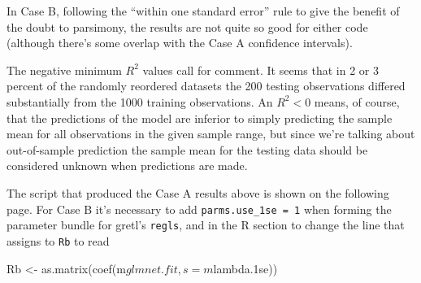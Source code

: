 \documentclass{article}
\begin{document}
In Case B, following the ``within one standard error'' rule to give
the benefit of the doubt to parsimony, the results are not quite so
good for either code (although there's some overlap with the Case A
confidence intervals).

The negative minimum $R^2$ values call for comment. It seems that in 2
or 3 percent of the randomly reordered datasets the 200 testing
observations differed substantially from the 1000 training
observations. An $R^2 < 0$ means, of course, that the predictions of
the model are inferior to simply predicting the sample mean for all
observations in the given sample range, but since we're talking about
out-of-sample prediction the sample mean for the testing data should
be considered unknown when predictions are made.

The script that produced the Case A results above is shown on the
following page. For Case B it's necessary to add
\texttt{parms.use\_1se = 1} when forming the parameter bundle for
gretl's \texttt{regls}, and in the \textsf{R} section to change the
line that assigns to \texttt{Rb} to read
\begin{code}
Rb <- as.matrix(coef(m$glmnet.fit, s = m$lambda.1se))
\end{code}

\clearpage
\end{document}
